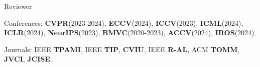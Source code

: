 


\begin{cventries}
\cvpub
{Reviewer} %
{ %
\begin{cvitems}
    \item {Conferences: \textbf{CVPR}(2023-2024), \textbf{ECCV}(2024), \textbf{ICCV}(2023),
        \textbf{ICML}(2024), \textbf{ICLR}(2024), \textbf{NeurIPS}(2023), \textbf{BMVC}(2020-2023),
    \textbf{ACCV}(2024), \textbf{IROS}(2024). }
    \item {Journals: IEEE \textbf{TPAMI}, IEEE \textbf{TIP}, \textbf{CVIU}, IEEE \textbf{R-AL}, ACM \textbf{TOMM}, \textbf{JVCI}, \textbf{JCISE}.}
\end{cvitems}
}
\end{cventries}

